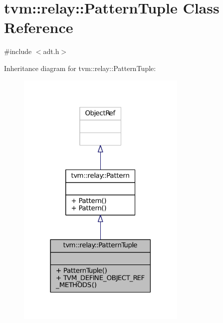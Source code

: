 \hypertarget{classtvm_1_1relay_1_1PatternTuple}{}\section{tvm\+:\+:relay\+:\+:Pattern\+Tuple Class Reference}
\label{classtvm_1_1relay_1_1PatternTuple}


{\ttfamily \#include $<$adt.\+h$>$}



Inheritance diagram for tvm\+:\+:relay\+:\+:Pattern\+Tuple\+:
\nopagebreak
\begin{figure}[H]
\begin{center}
\leavevmode
\includegraphics[width=230pt]{classtvm_1_1relay_1_1PatternTuple__inherit__graph}
\end{center}
\end{figure}


